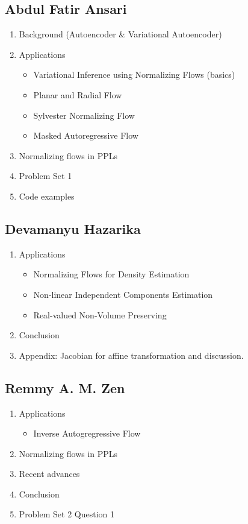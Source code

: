 \documentclass[runningheads]{llncs}
\begin{document}
\subsection*{Abdul Fatir Ansari}
\begin{enumerate}
	\item Background (Autoencoder \& Variational Autoencoder)
	\item Applications
	\begin{itemize}
		\item Variational Inference using Normalizing Flows (basics)
		\item Planar and Radial Flow
		\item Sylvester Normalizing Flow
		\item Masked Autoregressive Flow
	\end{itemize}
	\item Normalizing flows in PPLs
	\item Problem Set 1
	\item Code examples
\end{enumerate}

\subsection*{Devamanyu Hazarika}
\begin{enumerate}
	\item Applications
	\begin{itemize}
		\item Normalizing Flows for Density Estimation 
		\item Non-linear Independent Components Estimation
		\item Real-valued Non-Volume Preserving
	\end{itemize}
	\item Conclusion
    \item Appendix: Jacobian for affine transformation and discussion.
\end{enumerate}


\subsection*{Remmy A. M. Zen}
\begin{enumerate}
	\item Applications
	\begin{itemize}
		\item Inverse Autogregressive Flow
	\end{itemize}
	\item Normalizing flows in PPLs
	\item Recent advances
	\item Conclusion
	\item Problem Set 2 Question 1
\end{enumerate}
\end{document}
